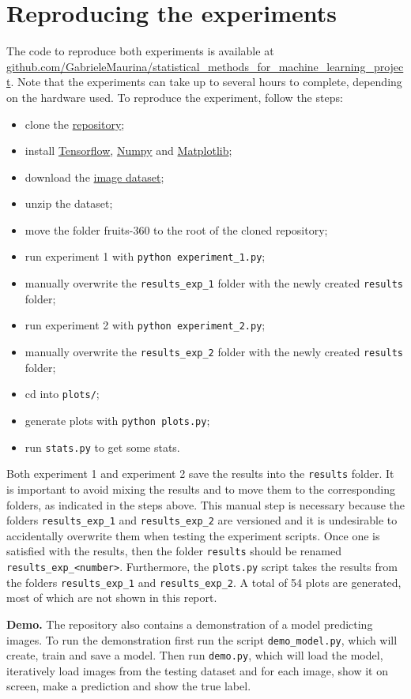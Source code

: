 \section{Reproducing the experiments}
\label{sec:repro}
The code to reproduce both experiments is available at \href{https://github.com/GabrieleMaurina/statistical\_methods\_for\_machine\_learning\_project}{github.com/GabrieleMaurina/statistical\_methods\_for\_machine\_learning\_project}. Note that the experiments can take up to several hours to complete, depending on the hardware used. To reproduce the experiment, follow the steps:
\begin{itemize}
    \item clone the \href{https://github.com/GabrieleMaurina/statistical\_methods\_for\_machine\_learning\_project}{repository};
    \item install \href{https://pypi.org/project/tensorflow/}{Tensorflow}, \href{https://pypi.org/project/numpy/}{Numpy} and \href{https://pypi.org/project/matplotlib/}{Matplotlib};
    \item download the \href{https://www.kaggle.com/moltean/fruits}{image dataset};
    \item unzip the dataset;
    \item move the folder fruits-360 to the root of the cloned repository;
    \item run experiment 1 with \texttt{python experiment\_1.py};
    \item manually overwrite the \texttt{results\_exp\_1} folder with the newly created \texttt{results} folder;
    \item run experiment 2 with \texttt{python experiment\_2.py};
    \item manually overwrite the \texttt{results\_exp\_2} folder with the newly created \texttt{results} folder;
    \item cd into \texttt{plots/};
    \item generate plots with \texttt{python plots.py};
    \item run \texttt{stats.py} to get some stats.
\end{itemize}
Both experiment 1 and experiment 2 save the results into the \texttt{results} folder. It is important to avoid mixing the results and to move them to the corresponding folders, as indicated in the steps above. This manual step is necessary because the folders \texttt{results\_exp\_1} and \texttt{results\_exp\_2} are versioned and it is undesirable to accidentally overwrite them when testing the experiment scripts. Once one is satisfied with the results, then the folder \texttt{results} should be renamed \texttt{results\_exp\_<number>}. Furthermore, the \texttt{plots.py} script takes the results from the folders \texttt{results\_exp\_1} and \texttt{results\_exp\_2}. A total of 54 plots are generated, most of which are not shown in this report.

\textbf{Demo.} The repository also contains a demonstration of a model predicting images. To run the demonstration first run the script \texttt{demo\_model.py}, which will create, train and save a model. Then run \texttt{demo.py}, which will load the model, iteratively load images from the testing dataset and for each image, show it on screen, make a prediction and show the true label.
